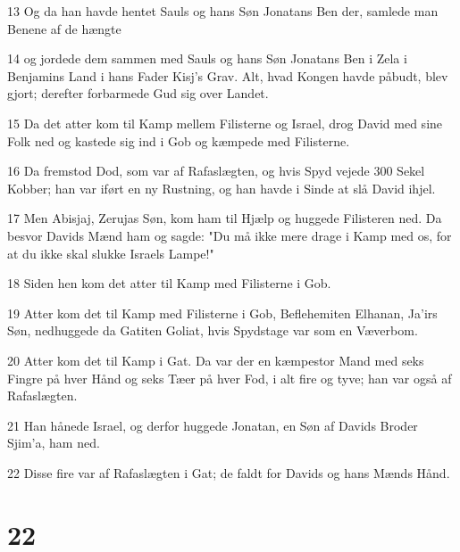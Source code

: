 \par 13 Og da han havde hentet Sauls og hans Søn Jonatans Ben der, samlede man Benene af de hængte
\par 14 og jordede dem sammen med Sauls og hans Søn Jonatans Ben i Zela i Benjamins Land i hans Fader Kisj's Grav. Alt, hvad Kongen havde påbudt, blev gjort; derefter forbarmede Gud sig over Landet.
\par 15 Da det atter kom til Kamp mellem Filisterne og Israel, drog David med sine Folk ned og kastede sig ind i Gob og kæmpede med Filisterne.
\par 16 Da fremstod Dod, som var af Rafaslægten, og hvis Spyd vejede 300 Sekel Kobber; han var iført en ny Rustning, og han havde i Sinde at slå David ihjel.
\par 17 Men Abisjaj, Zerujas Søn, kom ham til Hjælp og huggede Filisteren ned. Da besvor Davids Mænd ham og sagde: "Du må ikke mere drage i Kamp med os, for at du ikke skal slukke Israels Lampe!"
\par 18 Siden hen kom det atter til Kamp med Filisterne i Gob.
\par 19 Atter kom det til Kamp med Filisterne i Gob, Beflehemiten Elhanan, Ja'irs Søn, nedhuggede da Gatiten Goliat, hvis Spydstage var som en Væverbom.
\par 20 Atter kom det til Kamp i Gat. Da var der en kæmpestor Mand med seks Fingre på hver Hånd og seks Tæer på hver Fod, i alt fire og tyve; han var også af Rafaslægten.
\par 21 Han hånede Israel, og derfor huggede Jonatan, en Søn af Davids Broder Sjim'a, ham ned.
\par 22 Disse fire var af Rafaslægten i Gat; de faldt for Davids og hans Mænds Hånd.

\chapter{22}

